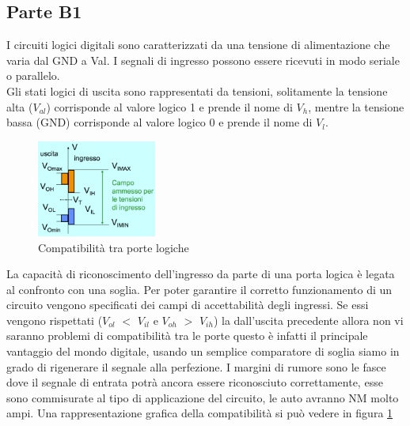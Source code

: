 \documentclass[12pt]{article}
\begin{document}
\subsection{Parte B1}\label{b1}
I circuiti logici digitali sono caratterizzati da una tensione di alimentazione che varia dal GND a Val. I segnali di ingresso possono essere ricevuti in modo seriale o parallelo.\\
Gli stati logici di uscita sono rappresentati da tensioni, solitamente la tensione alta ($V_{al}$) corrisponde al valore logico 1 e prende il nome di $V_{h}$, mentre la tensione bassa (GND) corrisponde al valore logico 0 e prende il nome di $V_{l}$.\\
\begin{figure}
  \centering
  \includegraphics[width=0.35\textwidth]{images/compat.png}
  \caption{Compatibilità tra porte logiche}
  \label{fig:compat}
\end{figure}
La capacità di riconoscimento dell’ingresso da parte di una porta logica è legata al confronto con una soglia. Per poter garantire il corretto funzionamento di un circuito vengono specificati dei campi di accettabilità degli ingressi. Se essi vengono rispettati ($V_{ol}$ $<$ $V_{il}$ e $V_{oh}$ $>$ $V_{ih}$) la dall’uscita precedente allora non vi saranno problemi di compatibilità tra le porte questo è infatti il principale vantaggio del mondo digitale, usando un semplice comparatore di soglia siamo in grado di rigenerare il segnale alla perfezione. I margini di rumore sono le fasce dove il segnale di entrata potrà ancora essere riconosciuto correttamente, esse sono commisurate al tipo di applicazione del circuito, le auto avranno NM molto ampi. Una rappresentazione grafica della compatibilità si può vedere in figura \ref{fig:compat}
\end{document}
